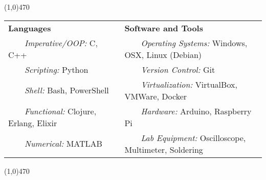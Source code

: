 \documentclass[11pt, a4paper]{article} %
\newcommand{\tabitem}{~~\llap{\textbullet}~~}
\begin{document}
\noindent \line(1,0){470}\\

 \smallskip
\vspace{-10pt}
\begin{center}
\begin{tabular}{l|l}
	{\bf Languages} & {\bf Software and Tools} \\
	\tabitem \textit{Imperative/OOP:} C, C++ & \tabitem \textit{Operating Systems:} Windows, OSX, Linux (Debian)\\
	\tabitem \textit{Scripting:} Python & \tabitem \textit{Version Control:} Git\\
	\tabitem \textit{Shell:} Bash, PowerShell & \tabitem \textit{Virtualization:} VirtualBox, VMWare, Docker \\
	\tabitem \textit{Functional:} Clojure, Erlang, Elixir & \tabitem \textit{Hardware:} Arduino, Raspberry Pi\\
	\tabitem \textit{Numerical:} MATLAB & \tabitem \textit{Lab Equipment:} Oscilloscope, Multimeter, Soldering \\
\end{tabular}
\end{center}

\noindent \line(1,0){470} \\
\end{document}
